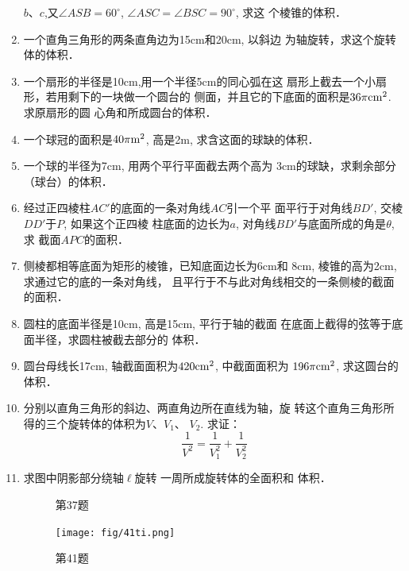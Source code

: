 \begin{enumerate}
$b$、$c$,又$\angle ASB=60^{\circ}$, $\angle ASC=\angle BSC=90^{\circ}$, 求这
个棱锥的体积．
\item 一个直角三角形的两条直角边为15cm和20cm, 以斜边
为轴旋转，求这个旋转体的体积．
\item 一个扇形的半径是10cm,用一个半径5cm的同心弧在这
扇形上截去一个小扇形，若用剩下的一块做一个圆台的
侧面，并且它的下底面的面积是$36\pi {\rm cm^2}$. 求原扇形的圆
心角和所成圆台的体积．
\item 一个球冠的面积是$40\pi {\rm m^2}$, 高是2m, 求含这面的球缺的体积．
\item 一个球的半径为7cm, 用两个平行平面截去两个高为
3cm的球缺，求剩余部分（球台）的体积．
\item 经过正四棱柱$AC'$的底面的一条对角线$AC$引一个平
面平行于对角线$BD'$, 交棱$DD'$于$P$, 如果这个正四棱
柱底面的边长为$a$, 对角线$BD'$与底面所成的角是$\theta$, 求
截面$APC$的面积．
\item 侧棱都相等底面为矩形的棱锥，已知底面边长为6cm和
8cm, 棱锥的高为2cm, 求通过它的底的一条对角线，
且平行于不与此对角线相交的一条侧棱的截面的面积．
\item 圆柱的底面半径是10cm, 高是15cm, 平行于轴的截面
在底面上截得的弦等于底面半径，求圆柱被截去部分的
体积．
\item 圆台母线长17cm, 轴截面面积为$420{\rm cm^2}$, 中截面面积为
$196\pi {\rm cm^2}$, 求这圆台的体积．
\item 分别以直角三角形的斜边、两直角边所在直线为轴，旋
转这个直角三角形所得的三个旋转体的体积为$V$、$V_1$、
$V_2$.
求证：
\[\frac{1}{V^2}=\frac{1}{V^2_1}+\frac{1}{V^2_2}\]
\item 求图中阴影部分绕轴$\ell$旋转
一周所成旋转体的全面积和
体积．

\begin{figure}[htp]\centering
    \begin{minipage}[t]{0.48\textwidth}
    \centering
{}
    \caption*{第37题}
    \end{minipage}
    \begin{minipage}[t]{0.48\textwidth}
    \centering
      \texttt{[image: fig/41ti.png]}
    \caption*{第41题}
    \end{minipage}
    \end{figure}


\end{enumerate}
